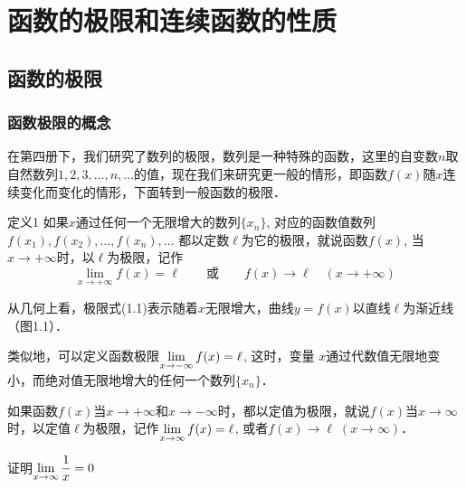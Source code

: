 \chapter{函数的极限和连续函数的性质}

\section{函数的极限}
\subsection{函数极限的概念}

在第四册下，我们研究了数列的极限，数列是一种特殊的函数，这里的自变数$n$取自然数列$1, 2, 3,\ldots,n,\ldots$的值，现在我们来研究更一般的情形，即函数$f(x)$随$x$连续变化而变化的情形，下面转到一般函数的极限．

\begin{blk}{定义1}
    如果$x$通过任何一个无限增大的数列$\{x_n\}$, 对应的函数值数列
$f (x_1 ) ,f (x_2) , \ldots,f (x_n ) ,\ldots$
都以定数$\ell$为它的极限，就说函数$f(x)$, 当$x\to +\infty$时，以$\ell$为极限，记作
\begin{equation}
    \lim_{x\to+\infty}f(x)=\ell\qquad \text{或}\qquad f(x)\to \ell\quad (x\to +\infty)
\end{equation}
\end{blk}
 
从几何上看，极限式(1.1)表示随着$x$无限增大，曲线$y=f(x)$以直线$\ell$为渐近线（图1.1）．
\begin{figure}[htp]
    \centering
{}
    \caption{}
\end{figure}

类似地，可以定义函数极限$\displaystyle\lim_{x\to -\infty} f(x)=\ell$, 这时，变量
$x$通过代数值无限地变小，而绝对值无限地增大的任何一个数列$\{x_n\}$．

如果函数$f(x)$当$x\to+\infty$和$x\to-\infty$时，都以定值为极限，就说$f(x)$当$x\to \infty$时，以定值$\ell$为极限，记作$\displaystyle\lim_{x\to\infty}f(x)=\ell$, 或者$f(x)\to \ell\; (x\to\infty)$．

\begin{example}
    证明$\displaystyle\lim_{x\to\infty}\dfrac{1}{x}=0$
\end{example}

